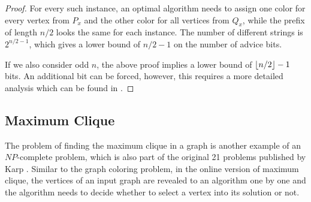 \begin{proof}
    For every such instance, an optimal algorithm needs to assign one
    color for every vertex from $P_x$ and the other color for all vertices
    from $Q_x$, while the prefix of length $n/2$ looks the same for each
    instance. The number of different strings is $2^{n/2-1}$, which gives
    a lower bound of $n/2-1$ on the number of advice bits.

    If we also consider odd $n$, the above proof implies a lower bound of
    $\lfloor n/2\rfloor-1$ bits. An additional bit can be forced, however, this
    requires a more detailed analysis which can be found in
    \cite{misof-trivial-graphs}.
\end{proof}

\subsection{Maximum Clique}

The problem of finding the maximum clique in a graph is another example of
an $NP$-complete problem, which is also part of the original 21 problems
published by Karp \cite{karp-np}. Similar to the graph coloring problem,
in the online version of maximum clique, the vertices of an input graph
are revealed to an algorithm one by one and the algorithm needs to decide
whether to select a vertex into its solution or not.

